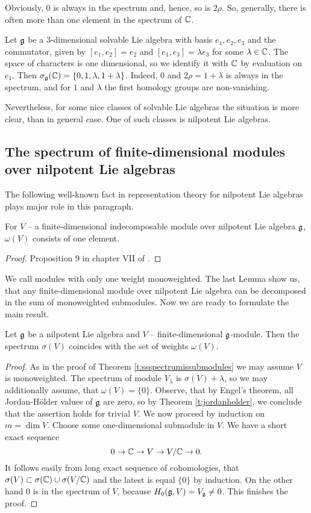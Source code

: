Obviously, $0$ is always in the spectrum and, hence, so is $2\rho$. So,
generally, there is often more than one element in the spectrum of $\mathbb{C}$. 
\begin{example}
   Let $\mathfrak{g}$ be a 3-dimensional solvable Lie algebra with basis $e_1, e_2, e_3$ and the
   commutator, given by $[e_1, e_2] = e_2$ and $[e_1, e_3] = \lambda e_3$ for some $\lambda \in
   \mathbb{C}$. The space of characters is one dimensional, so we identify it with $\mathbb{C}$ by evaluation on
   $e_1$. Then $\sigma_{\mathfrak{g}}(\mathbb{C}) = \{0,1,\lambda, 1 + \lambda\}$. Indeed, $0$ and $2\rho = 1 +
   \lambda$ is always in the spectrum, and for $1$ and $\lambda$ the first homology groups are
   non-vanishing.
\end{example}

Nevertheless, for some nice classes of solvable Lie
algebras the situation is more clear, than in general case. One of such classes is nilpotent Lie
algebras.

\subsection{The spectrum of finite-dimensional modules over nilpotent Lie algebras}
The following well-known fact in representation theory for nilpotent Lie algebras plays major role
in this paragraph.
\begin{lemma} \label{l:nilpdecomp}
    For $V$ -- a finite-dimensional indecomposable module over nilpotent Lie algebra $\mathfrak{g}$,
    $\omega(V)$ consists of one element.
\end{lemma}
\begin{proof}
    Proposition 9 in chapter VII of \cite{bourbaki}.
\end{proof}
We call modules with only one weight monoweighted. The last Lemma show us, that any
finite-dimensional module over nilpotent Lie algebra can be decomposed in the sum of monoweighted
submodules.  Now we are ready to formulate the main result.
\begin{theorem} \label{t:nilpspectrum}
    Let $\mathfrak{g}$ be a nilpotent Lie algebra and $V$ -- finite-dimensional $\mathfrak{g}$-module. Then the
    spectrum $\sigma(V)$ coincides with the set of weights $\omega(V)$.
\end{theorem}
\begin{proof}
    As in the proof of Theorem \ref{t:ssspectrumissubmodules} we may assume $V$ is monoweighted. The
    spectrum of module $V_{\lambda}$ is $\sigma(V) + \lambda$, so we may additionally assume, that
    $\omega(V) = \{0\}$. Observe, that by Engel's theorem, all Jordan-H{\"o}lder values of $\mathfrak{g}$
    are zero, so by Theorem \ref{t:jordanholder}, we conclude that the assertion holds for trivial
    $V$. We now proceed by induction on $m = \dim V$. Choose some one-dimensional submodule in $V$.
    We have a short exact sequence
    \[
        0\to \mathbb{C} \to V \to V/\mathbb{C} \to 0.
    \]
    It follows easily from long exact sequence of cohomologies, that $\sigma(V) \subset
    \sigma(\mathbb{C}) \cup \sigma(V/\mathbb{C})$ and the latest is equal $\{0\}$ by induction. On the other hand
    $0$ is in the spectrum of $V$, because $H_0(\mathfrak{g}, V) = V_{\mathfrak{g}} \neq 0$. This finishes the
    proof.
\end{proof}

